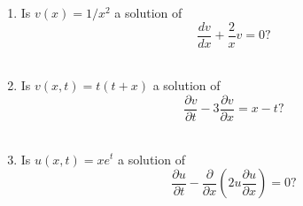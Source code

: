 
\begin{enumerate}
\item Is $v(x) = 1/x^2$ a solution of
\[
\frac{dv}{dx}+\frac{2}{x}v=0?
\]
\\
\item Is $v(x,t) = t(t+x)$ a solution of
\[
\frac{\partial v}{\partial t}-3\frac{\partial v}{\partial x}=x-t?
\]
\\
\item Is $u(x,t) = x e^t$ a solution of
\[
\frac{\partial u}{\partial t}-\frac{\partial}{\partial x}\left(2u\frac{\partial u}{\partial x}\right) = 0?
\]
\end{enumerate}




